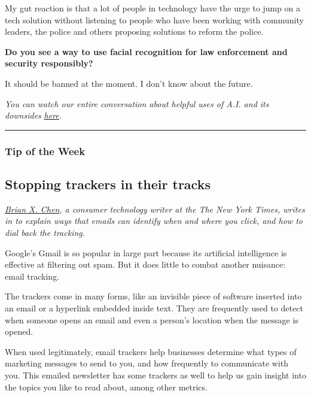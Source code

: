 My gut reaction is that a lot of people in technology have the urge to
jump on a tech solution without listening to people who have been
working with community leaders, the police and others proposing
solutions to reform the police.

\textbf{Do you see a way to use facial recognition for law enforcement
and security responsibly?}

It should be banned at the moment. I don't know about the future.

\emph{You can watch our entire conversation about helpful uses of A.I.
and its downsides}
\href{https://www.youtube.com/watch?v=uYlR3OIUQx4\&feature=youtu.be}{\emph{here}}\emph{.}

\begin{center}\rule{0.5\linewidth}{\linethickness}\end{center}

\hypertarget{tip-of-the-week}{%
\subsubsection{Tip of the Week}\label{tip-of-the-week}}

\hypertarget{stopping-trackers-in-their-tracks}{%
\subsection{Stopping trackers in their
tracks}\label{stopping-trackers-in-their-tracks}}

\href{https://www.nytimes3xbfgragh.onion/by/brian-x-chen}{\emph{Brian X.
Chen}}\emph{, a consumer technology writer at the The New York Times,
writes in to explain ways that emails can identify when and where you
click, and how to dial back the tracking.}

Google's Gmail is so popular in large part because its artificial
intelligence is effective at filtering out spam. But it does little to
combat another nuisance: email tracking.

The trackers come in many forms, like an invisible piece of software
inserted into an email or a hyperlink embedded inside text. They are
frequently used to detect when someone opens an email and even a
person's location when the message is opened.

When used legitimately, email trackers help businesses determine what
types of marketing messages to send to you, and how frequently to
communicate with you. This emailed newsletter has some trackers as well
to help us gain insight into the topics you like to read about, among
other metrics.

